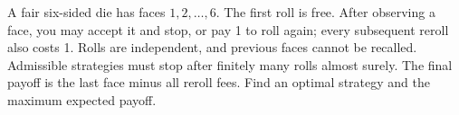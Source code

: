 A fair six-sided die has faces $1,2,\ldots,6$. The first roll is free. After observing a face, you may accept it and stop, or pay 1 to roll again; every subsequent reroll also costs 1. Rolls are independent, and previous faces cannot be recalled. Admissible strategies must stop after finitely many rolls almost surely. The final payoff is the last face minus all reroll fees. Find an optimal strategy and the maximum expected payoff.
